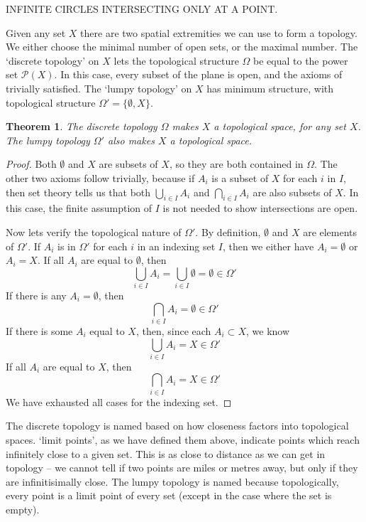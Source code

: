 \documentclass{report}
\theoremstyle{plain}
\newtheorem{theorem}{Theorem}[section]
\theoremstyle{definition}
\begin{document}
INFINITE CIRCLES INTERSECTING ONLY AT A POINT.

Given any set $X$ there are two spatial extremities we can use to form a topology. We either choose the minimal number of open sets, or the maximal number. The `discrete topology' on $X$ lets the topological structure $\Omega$ be equal to the power set $\mathcal{P}(X)$. In this case, every subset of the plane is open, and the axioms of trivially satisfied. The `lumpy topology' on $X$ has minimum structure, with topological structure $\Omega' = \{\emptyset, X\}$.

\begin{theorem}
    The discrete topology $\Omega$ makes $X$ a topological space, for any set $X$. The lumpy topology $\Omega'$ also makes $X$ a topological space.
\end{theorem}
\begin{proof}
    Both $\emptyset$ and $X$ are subsets of $X$, so they are both contained in $\Omega$. The other two axioms follow trivially, because if $A_i$ is a subset of $X$ for each $i$ in $I$, then set theory tells us that both $\bigcup_{i \in I} A_i$ and $\bigcap_{i \in I} A_i$ are also subsets of $X$. In this case, the finite assumption of $I$ is not needed to show intersections are open.

    Now lets verify the topological nature of $\Omega'$. By definition, $\emptyset$ and $X$ are elements of $\Omega'$. If $A_i$ is in $\Omega'$ for each $i$ in an indexing set $I$, then we either have $A_i = \emptyset$ or $A_i = X$. If all $A_i$ are equal to $\emptyset$, then
    \[ \bigcup_{i \in I} A_i = \bigcup_{i \in I} \emptyset = \emptyset \in \Omega' \]
    If there is any $A_i = \emptyset$, then
    \[ \bigcap_{i \in I} A_i = \emptyset \in \Omega' \]
    If there is some $A_i$ equal to $X$, then, since each $A_i \subset X$, we know
    \[ \bigcup_{i \in I} A_i = X \in \Omega' \]
    If all $A_i$ are equal to $X$, then
    \[ \bigcap_{i \in I} A_i = X \in \Omega' \]
    We have exhausted all cases for the indexing set.
\end{proof}

The discrete topology is named based on how closeness factors into topological spaces. `limit points', as we have defined them above, indicate points which reach infinitely close to a given set. This is as close to distance as we can get in topology -- we cannot tell if two points are miles or metres away, but only if they are infinitisimally close. The lumpy topology is named because topologically, every point is a limit point of every set (except in the case where the set is empty).
\end{document}

